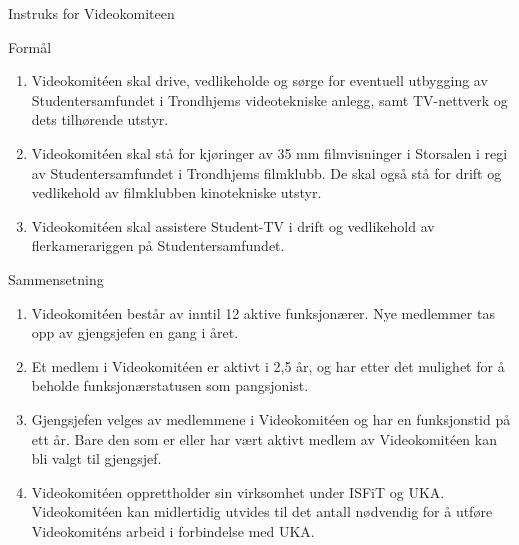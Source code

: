 \documentclass[../fsbok.tex]{subfiles}
\begin{document}
\begin{instruks*}{Instruks for Videokomiteen}
    
    \begin{instruksledd}{Formål}
        \begin{enumerate}
            \item Videokomit\'een skal drive, vedlikeholde og sørge for eventuell
                utbygging av Studentersamfundet i
                Trondhjems videotekniske anlegg, samt TV-nettverk og dets tilhørende utstyr.
            \item Videokomit\'een skal stå for kjøringer av 35 mm filmvisninger i
                Storsalen i regi av Studentersamfundet i
                Trondhjems filmklubb. De skal også stå for drift og vedlikehold av filmklubben
                kinotekniske utstyr.
            \item Videokomit\'een skal assistere Student-TV i drift og vedlikehold av
                flerkamerariggen på Studentersamfundet.
        \end{enumerate}
    \end{instruksledd}

    \begin{instruksledd}{Sammensetning}
        \begin{enumerate}
            \item Videokomit\'een består av inntil 12 aktive funksjonærer. Nye medlemmer tas opp av
            gjengsjefen en gang i året.
            \item  Et medlem i Videokomit\'een er aktivt i 2,5 år, og har etter det mulighet for å
            beholde funksjonærstatusen som pangsjonist.
            \item Gjengsjefen velges av medlemmene i Videokomit\'een og har en funksjonstid på ett
            år. Bare den som er eller
            har vært aktivt medlem av Videokomit\'een kan bli valgt til gjengsjef.
            \item Videokomit\'een opprettholder sin virksomhet under ISFiT og UKA.
                Videokomit\'een kan midlertidig utvides
            til det antall nødvendig for å utføre Videokomit\'ens arbeid i forbindelse med UKA.
        \end{enumerate}
    \end{instruksledd}


\end{instruks*}
\end{document}
